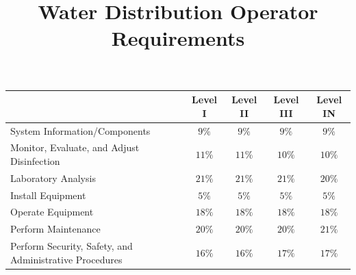 \documentclass[10pt]{article}
\title{Water Distribution Operator Requirements }
\author{}
\date{}
\begin{document}
\maketitle
\begin{tabular}{|l|c|c|c|c|}
\hline
 & Level I & Level II & Level III & Level IN \\
\hline
System Information/Components & $9 \%$ & $9 \%$ & $9 \%$ & $9 \%$ \\
\hline
Monitor, Evaluate, and Adjust Disinfection & $11 \%$ & $11 \%$ & $10 \%$ & $10 \%$ \\
\hline
Laboratory Analysis & $21 \%$ & $21 \%$ & $21 \%$ & $20 \%$ \\
\hline
Install Equipment & $5 \%$ & $5 \%$ & $5 \%$ & $5 \%$ \\
\hline
Operate Equipment & $18 \%$ & $18 \%$ & $18 \%$ & $18 \%$ \\
\hline
Perform Maintenance & $20 \%$ & $20 \%$ & $20 \%$ & $21 \%$ \\
\hline
Perform Security, Safety, and Administrative Procedures & $16 \%$ & $16 \%$ & $17 \%$ & $17 \%$ \\
\hline
\end{tabular}
\end{document}
